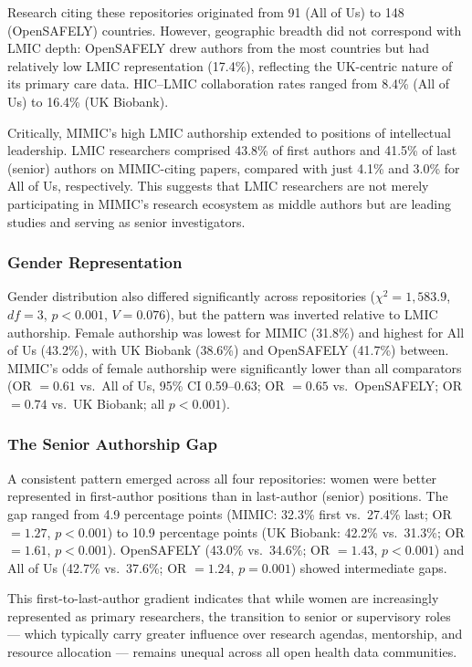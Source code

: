 \documentclass[11pt]{article}
\begin{document}
Research citing these repositories originated from 91 (All of Us) to 148 (OpenSAFELY) countries.
However, geographic breadth did not correspond with LMIC depth: OpenSAFELY drew authors from the most countries but had relatively low LMIC representation (17.4\%), reflecting the UK-centric nature of its primary care data.
HIC--LMIC collaboration rates ranged from 8.4\% (All of Us) to 16.4\% (UK Biobank).

Critically, MIMIC's high LMIC authorship extended to positions of intellectual leadership.
LMIC researchers comprised 43.8\% of first authors and 41.5\% of last (senior) authors on MIMIC-citing papers, compared with just 4.1\% and 3.0\% for All of Us, respectively.
This suggests that LMIC researchers are not merely participating in MIMIC's research ecosystem as middle authors but are leading studies and serving as senior investigators.

\subsubsection{Gender Representation}

Gender distribution also differed significantly across repositories ($\chi^2 = 1{,}583.9$, $df = 3$, $p < 0.001$, $V = 0.076$), but the pattern was inverted relative to LMIC authorship.
Female authorship was lowest for MIMIC (31.8\%) and highest for All of Us (43.2\%), with UK Biobank (38.6\%) and OpenSAFELY (41.7\%) between.
MIMIC's odds of female authorship were significantly lower than all comparators (OR $= 0.61$ vs.\ All of Us, 95\% CI 0.59--0.63; OR $= 0.65$ vs.\ OpenSAFELY; OR $= 0.74$ vs.\ UK Biobank; all $p < 0.001$).

\subsubsection{The Senior Authorship Gap}

A consistent pattern emerged across all four repositories: women were better represented in first-author positions than in last-author (senior) positions.
The gap ranged from 4.9 percentage points (MIMIC: 32.3\% first vs.\ 27.4\% last; OR $= 1.27$, $p < 0.001$) to 10.9 percentage points (UK Biobank: 42.2\% vs.\ 31.3\%; OR $= 1.61$, $p < 0.001$).
OpenSAFELY (43.0\% vs.\ 34.6\%; OR $= 1.43$, $p < 0.001$) and All of Us (42.7\% vs.\ 37.6\%; OR $= 1.24$, $p = 0.001$) showed intermediate gaps.

This first-to-last-author gradient indicates that while women are increasingly represented as primary researchers, the transition to senior or supervisory roles --- which typically carry greater influence over research agendas, mentorship, and resource allocation --- remains unequal across all open health data communities.
\end{document}
